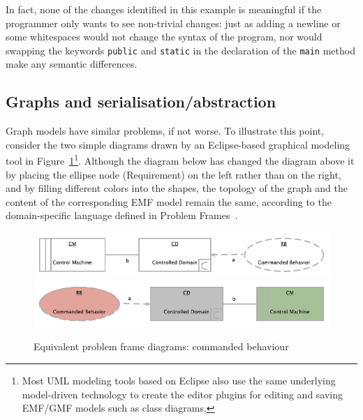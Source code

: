 \documentclass[10pt, conference, compsocconf]{IEEEtran}
\begin{document}
In fact, none of the changes identified in this example is meaningful if the programmer only wants to see non-trivial
changes: just as adding a newline or some whitespaces would not change the syntax of the program, nor would swapping the keywords {\tt public} and {\tt static} in the declaration of the {\tt main} method make any semantic differences.

\subsection{Graphs and serialisation/abstraction}
Graph models have similar problems, if not worse. To illustrate this point, consider the two simple diagrams drawn by an Eclipse-based graphical modeling tool in Figure~\ref{fig:1}\footnote{Most UML modeling tools based on Eclipse also use the same underlying model-driven technology to create the editor plugins for editing and saving EMF/GMF models such as class diagrams.}.
Although the diagram below has changed the diagram above it by placing the ellipse node (Requirement) on the left rather than on the right, and by filling different colors into the shapes, the topology of the graph and the content of the corresponding EMF model remain the same, according to the domain-specific language defined in Problem Frames~\cite{jackson01}.
\begin{figure}
\includegraphics[width=\columnwidth]{code/CommandedBehaviour1}
\includegraphics[width=\columnwidth]{code/CommandedBehaviour2}
\caption{Equivalent problem frame diagrams: commanded behaviour}\label{fig:1}
\end{figure}
\end{document}
